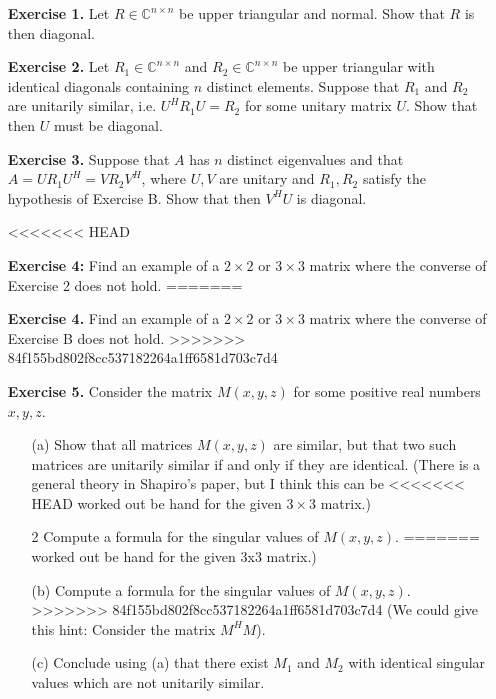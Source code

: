 \documentclass[14pt]{report}
\begin{document}
\begin{enumerate}
  \item[\textbf{Exercise 1.}] Let $R\in\mathbb{C}^{n\times n}$ be upper 
    triangular and normal. Show that $R$ is then diagonal. 

  \item[\textbf{Exercise 2.}] Let $R_1\in\mathbb{C}^{n\times n}$ and
    $R_2\in\mathbb{C}^{n\times n}$ be upper triangular with identical diagonals
    containing $n$ distinct elements. Suppose that $R_1$ and $R_2$ are 
    unitarily similar, i.e. $U^HR_1U = R_2$ for some unitary matrix $U$.
    Show that then $U$ must be diagonal.

  \item[\textbf{Exercise 3.}] Suppose that $A$ has $n$ distinct eigenvalues and
    that $A = U R_1 U^H = V R_2 V^H$, where $U,V$ are unitary and 
    $R_1, R_2$ satisfy the hypothesis of Exercise B. Show that then $V^H U$ is
    diagonal.

<<<<<<< HEAD
  \item[\textbf{Exercise 4:}] Find an example of a $2\times2$ or $3\times3$
    matrix where the converse of Exercise 2 does not hold.
=======
  \item[\textbf{Exercise 4.}] Find an example of a $2\times2$ or $3\times3$
    matrix where the converse of Exercise B does not hold.
>>>>>>> 84f155bd802f8cc537182264a1ff6581d703c7d4

  \item[\textbf{Exercise 5.}] Consider the matrix $M(x,y,z)$ for some positive
    real numbers $x,y,z$.
    \begin{enumerate}
      \item[(a)] Show that all matrices $M(x,y,z)$ are similar, but that two such
        matrices are unitarily similar if and only if they are identical.
        (There is a general theory in Shapiro's paper, but I think this can be
<<<<<<< HEAD
        worked out be hand for the given $3\times3$ matrix.)
      \item[2] Compute a formula for the singular values of $M(x,y,z)$. 
=======
        worked out be hand for the given 3x3 matrix.)
      \item[(b)] Compute a formula for the singular values of $M(x,y,z)$. 
>>>>>>> 84f155bd802f8cc537182264a1ff6581d703c7d4
        (We could give this hint: Consider the matrix $M^H M$).
      \item[(c)] Conclude using (a) that there exist $M_1$ and $M_2$ with
        identical singular values which are not unitarily similar.
      \end{enumerate}
  

\end{enumerate}
\end{document}
